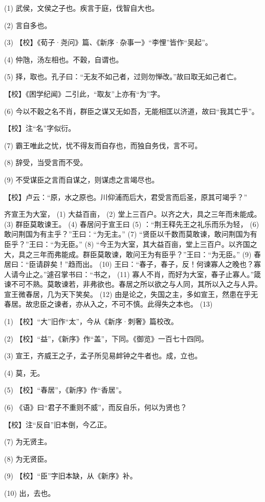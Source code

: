 \documentclass[12pt,UTF8]{ctexbook}
\begin{document}
(1) 武侯，文侯之子也。疾言于庭，伐智自大也。

(2) 言自多也。

(3) 【校】《荀子·尧问》篇、《新序·杂事一》“李悝”皆作“吴起”。

(4) 仲虺，汤左相也。不穀，自谓也。

(5) 择，取也。孔子曰：“无友不如己者，过则勿惮改。”故曰取无如己者亡。

【校】《困学纪闻》二引此，“取友”上亦有“为”字。

(6) 今以不穀之名不肖，群臣之谋又无如吾，无能相匡以济道，故曰“我其亡乎”。

【校】注“名”字似衍。

(7) 霸王唯此之忧，忧不得友而自存也，而独自务伐，言不可。

(8) 辞受，当受言而不受。

(9) 不受谋臣之言而自谋之，则谋虑之言竭尽也。

【校】卢云：“原，水之原也。川仰浦而后大，君受言而后圣，原其可竭乎？”

齐宣王为大室， (1) 大益百亩， (2) 堂上三百户。以齐之大，具之三年而未能成。 (3) 群臣莫敢谏王。 (4) 春居问于宣王曰 (5) ：“荆王释先王之礼乐而乐为轻， (6) 敢问荆国为有主乎？”王曰：“为无主。” (7) “贤臣以千数而莫敢谏，敢问荆国为有臣乎？”王曰：“为无臣。” (8) “今王为大室，其大益百亩，堂上三百户。以齐国之大，具之三年而弗能成。群臣莫敢谏，敢问王为有臣乎？”王曰：“为无臣。” (9) 春居曰：“臣请辟矣！”趋而出。 (10) 王曰：“春子，春子，反！何谏寡人之晚也？寡人请今止之。”遽召掌书曰：“书之， (11) 寡人不肖，而好为大室，春子止寡人。”箴谏不可不熟。莫敢谏若，非弗欲也。春居之所以欲之与人同，其所以入之与人异。宣王微春居，几为天下笑矣。 (12) 由是论之，失国之主，多如宣王，然患在乎无春居。故忠臣之谏者，亦从入之，不可不慎。此得失之本也。 (13)

(1) 【校】“大”旧作“太”，今从《新序·刺奢》篇校改。

(2) 【校】“益”，《新序》作“盖”，下同。《御览》一百七十四同。

(3) 宣王，齐威王之子，孟子所见易衅钟之牛者也。成，立也。

(4) 莫，无。

(5) 【校】“春居”，《新序》作“香居”。

(6) 《语》曰“君子不重则不威”，而反自乐，何以为贤也？

【校】注“反自”旧本倒，今乙正。

(7) 为无贤主。

(8) 为无贤臣。

(9) 【校】“臣”字旧本缺，从《新序》补。

(10) 出，去也。
\end{document}
